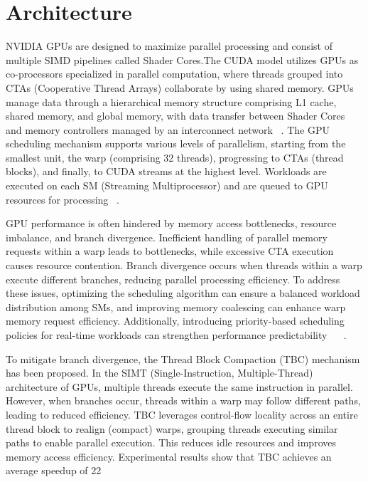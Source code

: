 \section{Architecture}

NVIDIA GPUs are designed to maximize parallel processing and consist of multiple SIMD pipelines called Shader Cores.The CUDA model utilizes GPUs as co-processors specialized in parallel computation, where threads grouped into CTAs (Cooperative Thread Arrays) collaborate by using shared memory. GPUs manage data through a hierarchical memory structure comprising L1 cache, shared memory, and global memory, with data transfer between Shader Cores and memory controllers managed by an interconnect network ~\cite{Bakhoda2009}. The GPU scheduling mechanism supports various levels of parallelism, starting from the smallest unit, the warp (comprising 32 threads), progressing to CTAs (thread blocks), and finally, to CUDA streams at the highest level. Workloads are executed on each SM (Streaming Multiprocessor) and are queued to GPU resources for processing ~\cite{Sanudo2020}.

GPU performance is often hindered by memory access bottlenecks, resource imbalance, and branch divergence. Inefficient handling of parallel memory requests within a warp leads to bottlenecks, while excessive CTA execution causes resource contention. Branch divergence occurs when threads within a warp execute different branches, reducing parallel processing efficiency. To address these issues, optimizing the scheduling algorithm can ensure a balanced workload distribution among SMs, and improving memory coalescing can enhance warp memory request efficiency. Additionally, introducing priority-based scheduling policies for real-time workloads can strengthen performance predictability ~\cite{Bakhoda2009} ~\cite{Sanudo2020}.

To mitigate branch divergence, the Thread Block Compaction (TBC) mechanism has been proposed. In the SIMT (Single-Instruction, Multiple-Thread) architecture of GPUs, multiple threads execute the same instruction in parallel. However, when branches occur, threads within a warp may follow different paths, leading to reduced efficiency. TBC leverages control-flow locality across an entire thread block to realign (compact) warps, grouping threads executing similar paths to enable parallel execution. This reduces idle resources and improves memory access efficiency. Experimental results show that TBC achieves an average speedup of 22%


